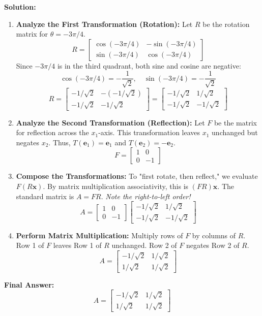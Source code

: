 \documentclass[11pt]{article}
\begin{document}
\textbf{Solution:}
\begin{enumerate}
    \item \textbf{Analyze the First Transformation (Rotation):} Let $R$ be the rotation matrix for $\theta = -3\pi/4$.
    \[ R = \begin{bmatrix} \cos(-3\pi/4) & -\sin(-3\pi/4) \\ \sin(-3\pi/4) & \cos(-3\pi/4) \end{bmatrix} \]
    Since $-3\pi/4$ is in the third quadrant, both sine and cosine are negative:
    \[ \cos(-3\pi/4) = -\frac{1}{\sqrt{2}}, \quad \sin(-3\pi/4) = -\frac{1}{\sqrt{2}} \]
    \[ R = \begin{bmatrix} -1/\sqrt{2} & -(-1/\sqrt{2}) \\ -1/\sqrt{2} & -1/\sqrt{2} \end{bmatrix} = \begin{bmatrix} -1/\sqrt{2} & 1/\sqrt{2} \\ -1/\sqrt{2} & -1/\sqrt{2} \end{bmatrix} \]
    \item \textbf{Analyze the Second Transformation (Reflection):} Let $F$ be the matrix for reflection across the $x_1$-axis. This transformation leaves $x_1$ unchanged but negates $x_2$. Thus, $T(\mathbf{e}_1) = \mathbf{e}_1$ and $T(\mathbf{e}_2) = -\mathbf{e}_2$.
    \[ F = \begin{bmatrix} 1 & 0 \\ 0 & -1 \end{bmatrix} \]
    \item \textbf{Compose the Transformations:} To "first rotate, then reflect," we evaluate $F(R\mathbf{x})$. By matrix multiplication associativity, this is $(FR)\mathbf{x}$. The standard matrix is $A = FR$. \textit{Note the right-to-left order!}
    \[ A = \begin{bmatrix} 1 & 0 \\ 0 & -1 \end{bmatrix} \begin{bmatrix} -1/\sqrt{2} & 1/\sqrt{2} \\ -1/\sqrt{2} & -1/\sqrt{2} \end{bmatrix} \]
    \item \textbf{Perform Matrix Multiplication:} Multiply rows of $F$ by columns of $R$.
    Row 1 of $F$ leaves Row 1 of $R$ unchanged. Row 2 of $F$ negates Row 2 of $R$.
    \[ A = \begin{bmatrix} -1/\sqrt{2} & 1/\sqrt{2} \\ 1/\sqrt{2} & 1/\sqrt{2} \end{bmatrix} \]
\end{enumerate}
\textbf{Final Answer:} \[ A = \begin{bmatrix} -1/\sqrt{2} & 1/\sqrt{2} \\ 1/\sqrt{2} & 1/\sqrt{2} \end{bmatrix} \]
\end{document}
